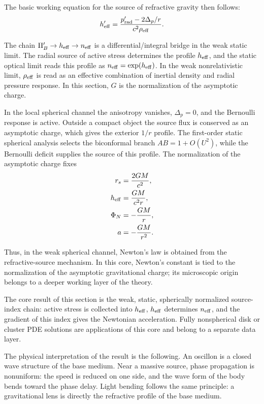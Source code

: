 \documentclass[12pt]{article}
\begin{document}
The basic working equation for the source of refractive gravity then follows:
\begin{equation}
h_{\rm eff}'=\frac{p_{\rm rad}'-2\Delta_p/r}{c^2\rho_{\rm eff}} .
\end{equation}

The chain $\Pi_B'\to h_{\rm eff}\to n_{\rm eff}$ is a differential/integral bridge in the weak static limit. The radial source of active stress determines the profile $h_{\rm eff}$, and the static optical limit reads this profile as $n_{\rm eff}=\exp(h_{\rm eff})$. In the weak nonrelativistic limit, $\rho_{\rm eff}$ is read as an effective combination of inertial density and radial pressure response. In this section, $G$ is the normalization of the asymptotic charge.

In the local spherical channel the anisotropy vanishes, $\Delta_p=0$, and the Bernoulli response is active. Outside a compact object the source flux is conserved as an asymptotic charge, which gives the exterior $1/r$ profile. The first-order static spherical analysis selects the biconformal branch $AB=1+O(U^2)$, while the Bernoulli deficit supplies the source of this profile. The normalization of the asymptotic charge fixes
\begin{align}
r_s &= \frac{2GM}{c^2}, \\
h_{\rm eff} &= \frac{GM}{c^2r}, \\
\Phi_N &= -\frac{GM}{r}, \\
a &= -\frac{GM}{r^2}.
\end{align}

Thus, in the weak spherical channel, Newton's law is obtained from the refractive-source mechanism. In this core, Newton's constant is tied to the normalization of the asymptotic gravitational charge; its microscopic origin belongs to a deeper working layer of the theory.

The core result of this section is the weak, static, spherically normalized source-index chain: active stress is collected into $h_{\rm eff}$, $h_{\rm eff}$ determines $n_{\rm eff}$, and the gradient of this index gives the Newtonian acceleration. Fully nonspherical disk or cluster PDE solutions are applications of this core and belong to a separate data layer.

The physical interpretation of the result is the following. An oscillon is a closed wave structure of the base medium. Near a massive source, phase propagation is nonuniform: the speed is reduced on one side, and the wave form of the body bends toward the phase delay. Light bending follows the same principle: a gravitational lens is directly the refractive profile of the base medium.
\end{document}
